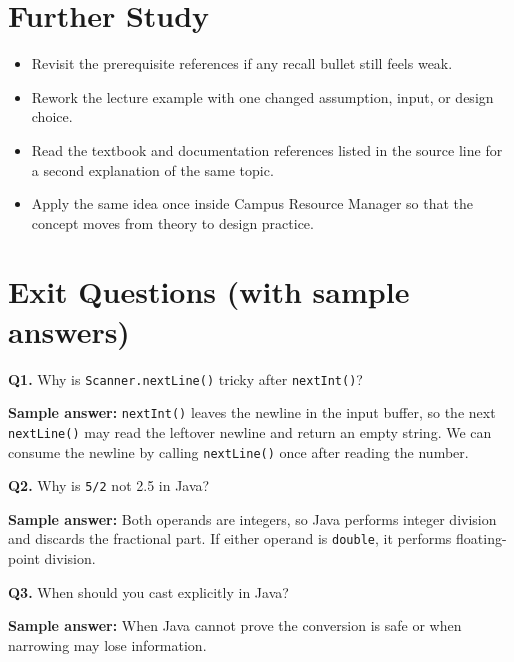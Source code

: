 \documentclass[11pt]{article}
\begin{document}
\section{Further Study}
\begin{itemize}
  \item Revisit the prerequisite references if any recall bullet still feels weak.
  \item Rework the lecture example with one changed assumption, input, or design choice.
  \item Read the textbook and documentation references listed in the source line for a second explanation of the same topic.
  \item Apply the same idea once inside Campus Resource Manager so that the concept moves from theory to design practice.
\end{itemize}
\notesources{\OOPSUnitISources}

\section{Exit Questions (with sample answers)}
\textbf{Q1.} Why is \texttt{Scanner.nextLine()} tricky after \texttt{nextInt()}?\par
\textbf{Sample answer:} \texttt{nextInt()} leaves the newline in the input buffer, so the next \texttt{nextLine()} may read the leftover newline and return an empty string. We can consume the newline by calling \texttt{nextLine()} once after reading the number.

\vspace{0.6em}
\textbf{Q2.} Why is \texttt{5/2} not 2.5 in Java?\par
\textbf{Sample answer:} Both operands are integers, so Java performs integer division and discards the fractional part. If either operand is \texttt{double}, it performs floating-point division.

\vspace{0.6em}
\textbf{Q3.} When should you cast explicitly in Java?\par
\textbf{Sample answer:} When Java cannot prove the conversion is safe or when narrowing may lose information.
\end{document}
